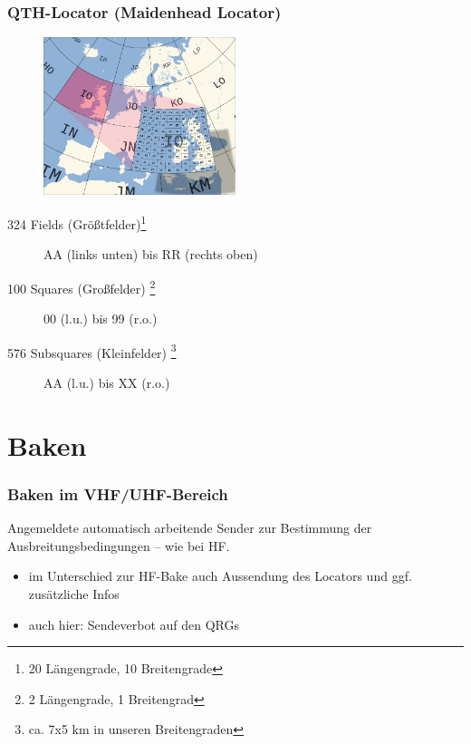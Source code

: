 \begin{frame}
  \frametitle{QTH-Locator (Maidenhead Locator)}

  \begin{center}
    \begin{figure}
      \includegraphics[width=0.5\textwidth,height=.3\textheight,keepaspectratio]{bv11/Maidenhead_grid_over_Europe.png}
    \end{figure}
  \end{center}

  \begin{description}
    \item[324 Fields (Größtfelder)\footnote{20 Längengrade, 10 Breitengrade}] AA (links unten) bis RR (rechts oben)
    \item[100 Squares (Großfelder) \footnote{2 Längengrade, 1 Breitengrad}] 00 (l.u.) bis 99 (r.o.)
    \item[576 Subsquares (Kleinfelder) \footnote{ca. 7x5 km in unseren Breitengraden}] AA (l.u.) bis XX (r.o.)
  \end{description}

\end{frame}

\section{Baken}

\begin{frame}
  \frametitle{Baken im VHF/UHF-Bereich}

  Angemeldete automatisch arbeitende Sender zur Bestimmung der
  Ausbreitungsbedingungen -- wie bei HF.

  \begin{itemize}
    \item im Unterschied zur HF-Bake auch Aussendung des Locators und ggf.
      zusätzliche Infos
    \item auch hier: Sendeverbot auf den QRGs
  \end{itemize}

\end{frame}

